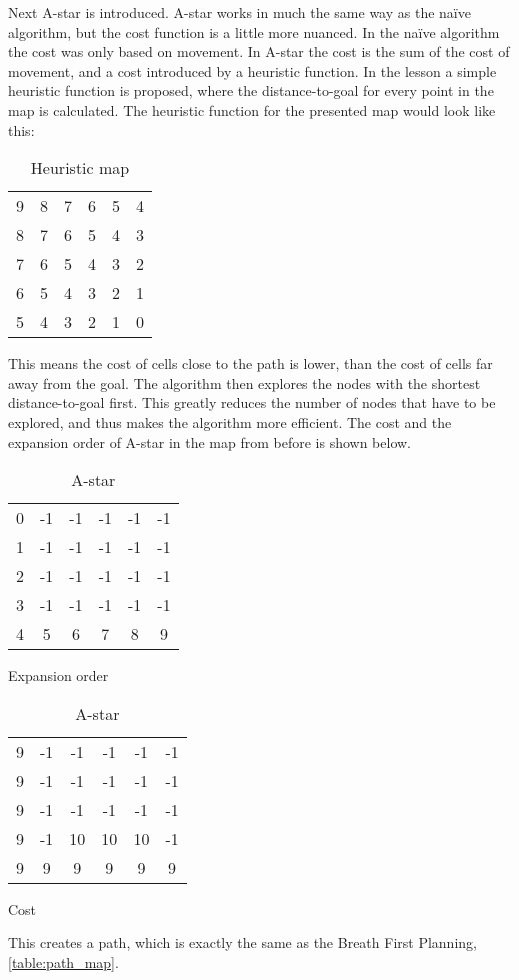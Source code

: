 \documentclass[Main]{subfiles}
\begin{document}
Next A-star is introduced. 
A-star works in much the same way as the naïve algorithm, but the cost function is a little more nuanced.
In the naïve algorithm the cost was only based on movement. 
In A-star the cost is the sum of the cost of movement, and a cost introduced by a heuristic function. 
In the lesson a simple heuristic function is proposed, where the distance-to-goal for every point in the map is calculated. 
The heuristic function for the presented map would look like this:
\begin{table}[H]
	\centering
	\begin{tabular}{cccccc}
		9 & 8 & 7 & 6 & 5 & 4  \\ 
		8 & 7 & 6 & 5 & 4 & 3  \\ 
		7 & 6 & 5 & 4 & 3 & 2  \\ 
		6 & 5 & 4 & 3 & 2 & 1  \\  
		5 & 4 & 3 & 2 & 1 & 0  \\ 
	\end{tabular}
\caption{Heuristic map}
\label{table:heuristic_map} 
\end{table} \noindent
This means the cost of cells close to the path is lower, than the cost of cells far away from the goal.
The algorithm then explores the nodes with the shortest distance-to-goal first. 
This greatly reduces the number of nodes that have to be explored, and thus makes the algorithm more efficient. 
The cost and the expansion order of A-star in the map from before is shown below.
\begin{table}[H]
	\begin{subtable}{0.5\linewidth}
		\centering
		\begin{tabular}{cccccc}
			0 & -1 & -1 & -1 & -1 & -1  \\ 
			1 & -1 & -1 & -1 & -1 & -1  \\ 
			2 & -1 & -1 & -1 & -1 & -1  \\ 
			3 & -1 & -1 & -1 & -1 & -1  \\  
			4 &  5 &  6 &  7 &  8 &  9  \\ 
		\end{tabular}
	\caption{Expansion order}
	\label{table:expansion_order_heuristic} 
	\end{subtable}
	\begin{subtable}{0.5\linewidth}
		\centering
		\begin{tabular}{cccccc}
			9 & -1 & -1 & -1 & -1 & -1  \\ 
			9 & -1 & -1 & -1 & -1 & -1  \\ 
			9 & -1 & -1 & -1 & -1 & -1  \\ 
			9 & -1 & 10 & 10 & 10 & -1  \\  
			9 &  9 &  9 &  9 &  9 &  9  \\ 
		\end{tabular}
	\caption{Cost}
	\label{table:cost_order_heuristic} 
	\end{subtable}
\caption{A-star}
\end{table} \noindent
This creates a path, which is exactly the same as the Breath First Planning, \autoref{table:path_map}.
\end{document}
